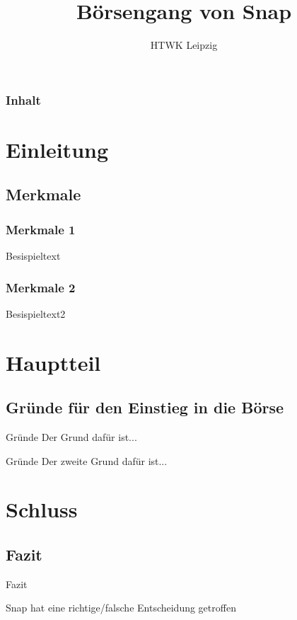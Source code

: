\documentclass{beamer}
\title{Börsengang von Snap}
\institute{Alex Dudin, Hendrik Schick, Andre Hildebrandt}
\author[]{HTWK Leipzig} %
\begin{document}
\begin{frame}
\titlepage
\end{frame}

\begin{frame}
\frametitle{Inhalt}
\tableofcontents
\end{frame}

\section{Einleitung}
\subsection{Merkmale}

\begin{frame}
\frametitle{Merkmale 1}

Besispieltext

\end{frame}

\begin{frame}
\frametitle{Merkmale 2}

Besispieltext2

\end{frame}


\section{Hauptteil}
\subsection{Gründe für den Einstieg in die Börse}
\begin{frame} {Gründe}
	Der Grund dafür ist...
\end{frame}


\begin{frame} {Gründe}
Der zweite Grund dafür ist...
\end{frame}



\section{Schluss}
\subsection{Fazit}
\begin{frame}{Fazit}

Snap hat eine richtige/falsche Entscheidung getroffen

\end{frame}
\end{document}
